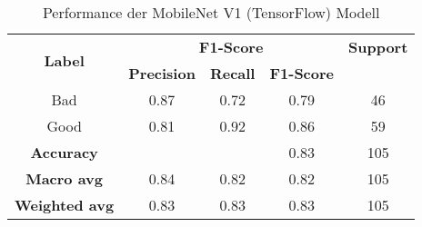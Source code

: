 \begin{table}[H]
\centering
\begin{tabular}{|c|c|c|c|c|}
\hline
\multirow{2}{*}{\textbf{Label}} & \multicolumn{3}{c|}{\textbf{F1-Score}} & \textbf{Support} \\
\cline{2-4}
                               & \textbf{Precision} & \textbf{Recall} & \textbf{F1-Score} & \\
\hline
Bad                           & 0.87 & 0.72 & 0.79 & 46 \\
Good                          & 0.81 & 0.92 & 0.86 & 59 \\
\hline
\textbf{Accuracy}             & & & 0.83 & 105 \\
\hline
\textbf{Macro avg}            & 0.84 & 0.82 & 0.82 & 105 \\
\hline
\textbf{Weighted avg}         & 0.83 & 0.83 & 0.83 & 105 \\
\hline
\end{tabular}
\caption{Performance der MobileNet V1 (TensorFlow) Modell}
\end{table}
